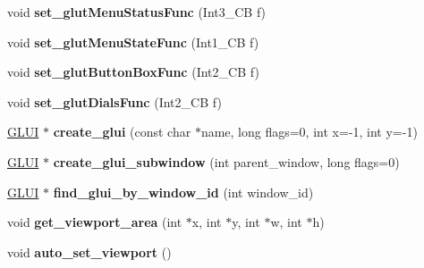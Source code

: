 \begin{DoxyCompactItemize}
\item 
\hypertarget{classGLUI__Master__Object_af230d62a22c0016cf740977553c42c33}{void {\bfseries set\-\_\-glut\-Menu\-Status\-Func} (Int3\-\_\-\-C\-B f)}\label{classGLUI__Master__Object_af230d62a22c0016cf740977553c42c33}

\item 
\hypertarget{classGLUI__Master__Object_a191c14ba9994bf9ca365c5da06286c59}{void {\bfseries set\-\_\-glut\-Menu\-State\-Func} (Int1\-\_\-\-C\-B f)}\label{classGLUI__Master__Object_a191c14ba9994bf9ca365c5da06286c59}

\item 
\hypertarget{classGLUI__Master__Object_a02d788570f74d1997075c2ad536154ac}{void {\bfseries set\-\_\-glut\-Button\-Box\-Func} (Int2\-\_\-\-C\-B f)}\label{classGLUI__Master__Object_a02d788570f74d1997075c2ad536154ac}

\item 
\hypertarget{classGLUI__Master__Object_a8b6d9eed9feec3c8e138ebfe2c1b93e5}{void {\bfseries set\-\_\-glut\-Dials\-Func} (Int2\-\_\-\-C\-B f)}\label{classGLUI__Master__Object_a8b6d9eed9feec3c8e138ebfe2c1b93e5}

\item 
\hypertarget{classGLUI__Master__Object_aab5db5ba1b2a590be1415c00e2a9d644}{\hyperlink{classGLUI}{G\-L\-U\-I} $\ast$ {\bfseries create\-\_\-glui} (const char $\ast$name, long flags=0, int x=-\/1, int y=-\/1)}\label{classGLUI__Master__Object_aab5db5ba1b2a590be1415c00e2a9d644}

\item 
\hypertarget{classGLUI__Master__Object_a124da0ebe0097f3a3b2490b871c5c7a7}{\hyperlink{classGLUI}{G\-L\-U\-I} $\ast$ {\bfseries create\-\_\-glui\-\_\-subwindow} (int parent\-\_\-window, long flags=0)}\label{classGLUI__Master__Object_a124da0ebe0097f3a3b2490b871c5c7a7}

\item 
\hypertarget{classGLUI__Master__Object_ae6910731efd0ad41430ded9e88aa8315}{\hyperlink{classGLUI}{G\-L\-U\-I} $\ast$ {\bfseries find\-\_\-glui\-\_\-by\-\_\-window\-\_\-id} (int window\-\_\-id)}\label{classGLUI__Master__Object_ae6910731efd0ad41430ded9e88aa8315}

\item 
\hypertarget{classGLUI__Master__Object_a2bee4bcbf463ab57f6da65eeb9a93ee8}{void {\bfseries get\-\_\-viewport\-\_\-area} (int $\ast$x, int $\ast$y, int $\ast$w, int $\ast$h)}\label{classGLUI__Master__Object_a2bee4bcbf463ab57f6da65eeb9a93ee8}

\item 
\hypertarget{classGLUI__Master__Object_ad62e7468e51d92ac67617f1968b1c944}{void {\bfseries auto\-\_\-set\-\_\-viewport} ()}\label{classGLUI__Master__Object_ad62e7468e51d92ac67617f1968b1c944}


\end{DoxyCompactItemize}
